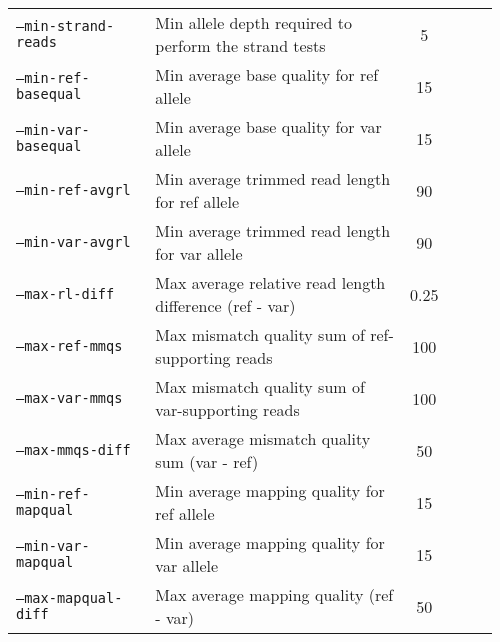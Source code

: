 \begin{table}[H]
\begin{tabular}{p{0.3\linewidth}p{0.56\linewidth}cp{0.1\linewidth}}
        \texttt{--min-strand-reads} & Min allele depth required to perform the strand tests & 5
				\\
        \texttt{--min-ref-basequal} & Min average base quality for ref allele & 15
				\\
        \texttt{--min-var-basequal} & Min average base quality for var allele & 15
				\\
        \texttt{--min-ref-avgrl} & Min average trimmed read length for ref allele & 90
				\\
        \texttt{--min-var-avgrl} & Min average trimmed read length for var allele & 90
        \\
        \texttt{--max-rl-diff} & Max average relative read length difference (ref - var) & 0.25
        \\
        \texttt{--max-ref-mmqs} & Max mismatch quality sum of ref-supporting reads & 100
        \\
        \texttt{--max-var-mmqs} & Max mismatch quality sum of var-supporting reads & 100
        \\
        \texttt{--max-mmqs-diff} & Max average mismatch quality sum (var - ref) & 50
        \\
        \texttt{--min-ref-mapqual} & Min average mapping quality for ref allele & 15
        \\
        \texttt{--min-var-mapqual} & Min average mapping quality for var allele & 15
        \\
        \texttt{--max-mapqual-diff} & Max average mapping quality (ref - var) & 50
        \\
				\hline
      \end{tabular}
\end{table}


